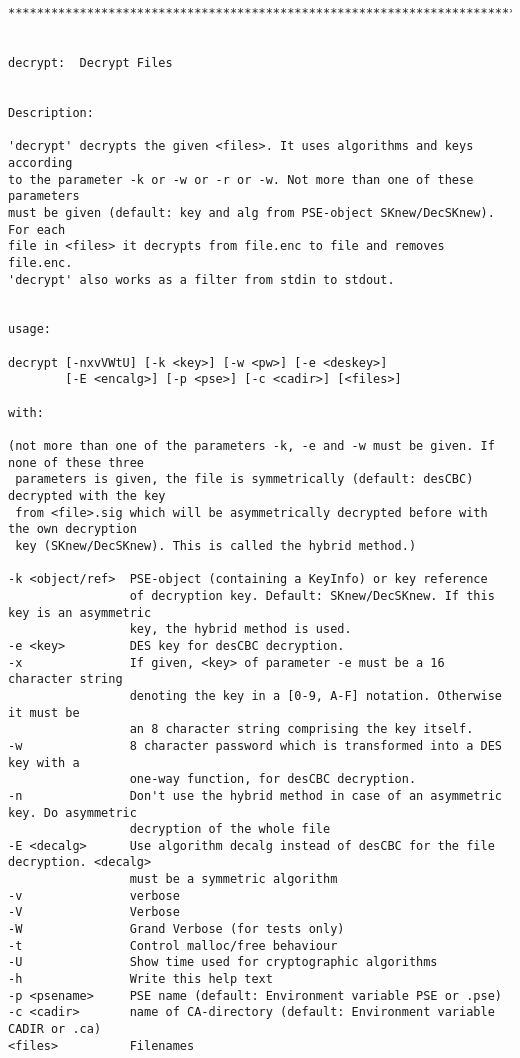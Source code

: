 {\begin{verbatim}
****************************************************************************************


decrypt:  Decrypt Files


Description:

'decrypt' decrypts the given <files>. It uses algorithms and keys according
to the parameter -k or -w or -r or -w. Not more than one of these parameters
must be given (default: key and alg from PSE-object SKnew/DecSKnew). For each
file in <files> it decrypts from file.enc to file and removes file.enc.
'decrypt' also works as a filter from stdin to stdout.


usage:

decrypt [-nxvVWtU] [-k <key>] [-w <pw>] [-e <deskey>] 
        [-E <encalg>] [-p <pse>] [-c <cadir>] [<files>]

with:

(not more than one of the parameters -k, -e and -w must be given. If none of these three
 parameters is given, the file is symmetrically (default: desCBC) decrypted with the key 
 from <file>.sig which will be asymmetrically decrypted before with the own decryption 
 key (SKnew/DecSKnew). This is called the hybrid method.)

-k <object/ref>  PSE-object (containing a KeyInfo) or key reference 
                 of decryption key. Default: SKnew/DecSKnew. If this key is an asymmetric
                 key, the hybrid method is used.
-e <key>         DES key for desCBC decryption.
-x               If given, <key> of parameter -e must be a 16 character string
                 denoting the key in a [0-9, A-F] notation. Otherwise it must be
                 an 8 character string comprising the key itself.
-w               8 character password which is transformed into a DES key with a
                 one-way function, for desCBC decryption.
-n               Don't use the hybrid method in case of an asymmetric key. Do asymmetric
                 decryption of the whole file
-E <decalg>      Use algorithm decalg instead of desCBC for the file decryption. <decalg>
                 must be a symmetric algorithm
-v               verbose
-V               Verbose
-W               Grand Verbose (for tests only)
-t               Control malloc/free behaviour
-U               Show time used for cryptographic algorithms
-h               Write this help text
-p <psename>     PSE name (default: Environment variable PSE or .pse)
-c <cadir>       name of CA-directory (default: Environment variable CADIR or .ca)
<files>          Filenames


\end{verbatim}}
